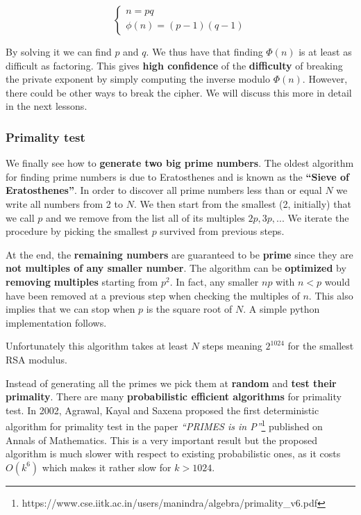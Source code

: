 $$
\begin{cases}
    n = pq \\
    \phi(n) = (p-1)(q-1)
\end{cases}
$$

By solving it we can find $p$ and $q$. We thus have that finding $\Phi(n)$ is at least as difficult as factoring. This gives \textbf{high confidence} of the \textbf{difficulty} of breaking the private exponent by simply computing the inverse modulo $\Phi(n)$. However, there could be other ways to break the cipher. We will discuss this more in detail in the next lessons.

\subsubsection{Primality test}
We finally see how to \textbf{generate two big prime numbers}. The oldest algorithm for finding prime numbers is due to Eratosthenes and is known as the \textbf{“Sieve of Eratosthenes”}. In order to discover all prime numbers less than or equal $N$ we write all numbers from 2 to $N$. We then start from the smallest (2, initially) that we call $p$ and we remove from the list all of its multiples $2p, 3p, .. $. We iterate the procedure by picking the smallest $p$ survived from previous steps.


At the end, the \textbf{remaining numbers} are guaranteed to be \textbf{prime} since they are \textbf{not multiples of any smaller number}. The algorithm can be \textbf{optimized} by \textbf{removing} \textbf{multiples} starting from $p^2$. In fact, any smaller $np$ with $n < p$ would have been removed at a previous step when checking the multiples of $n$. This also implies that we can stop when $p$ is the square root of $N$. A simple python implementation follows.


Unfortunately this algorithm takes at least $N$ steps meaning $2^{1024}$ for the smallest RSA modulus.

Instead of generating all the primes we pick them at \textbf{random} and \textbf{test their primality}. There are many \textbf{probabilistic efficient algorithms} for primality test. In 2002, Agrawal, Kayal and Saxena proposed the first deterministic algorithm for primality test in the paper \textit{“PRIMES is in P”}\footnote{https://www.cse.iitk.ac.in/users/manindra/algebra/primality_v6.pdf} published on Annals of Mathematics. This is a very important result but the proposed algorithm is much slower with respect to existing probabilistic ones, as it costs $O(k^6)$ which makes it rather slow for $k > 1024$.

